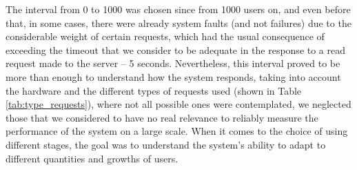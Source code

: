   The interval from 0 to 1000 was chosen since from 1000 users on, and even before that, in some cases, there were already system faults (and not failures) due to the considerable weight of certain requests, which had the usual consequence of exceeding the timeout that we consider to be adequate in the response to a read request made to the server -- 5 seconds. Nevertheless, this interval proved to be more than enough to understand how the system responds, taking into account the hardware and the different types of requests used (shown in Table \ref{tab:type_requests}), where not all possible ones were contemplated, we neglected those that we considered to have no real relevance to reliably measure the performance of the system on a large scale. When it comes to the choice of using different stages, the goal was to understand the system's ability to adapt to different quantities and growths of users.
  
  \newpage
  
